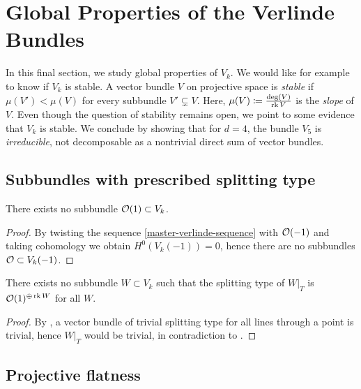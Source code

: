
\newcommand{\sm}{\text{sm}}
\newcommand{\PGL}{\operatorname {PGL}}
\newcommand{\ch}{\operatorname {ch}}
\newcommand{\CH}{\operatorname{CH}}

\section{Global Properties of the Verlinde Bundles}

In this final section, we study global properties of $V_k$. We would like for example to know if $V_k$ is stable. A vector bundle $V$ on projective space is \emph{stable} if $\mu(V')<\mu(V)$ for every subbundle $V'\subsetneq V$. Here,
$\mu(V)\coloneqq \frac{\deg(V)}{\operatorname{rk}{V}}$ is the \emph{slope} of $V$. Even though the question of stability remains open, we point to some evidence that $V_k$ is stable. We conclude by showing that for $d=4$, the bundle $V_5$ is \emph{irreducible}, \ie not decomposable as a nontrivial direct sum of vector bundles.

\subsection{Subbundles with prescribed splitting type}

\begin{proposition} \label{no-generic-splitting}
	There exists no subbundle $\mathcal{O}(1)\subset V_k$.
\end{proposition}

\begin{proof}
	By twisting the sequence \cref{master-verlinde-sequence} with $\mathcal{O}(-1)$ and taking cohomology we obtain $H^0(V_k(-1))=0$, hence there are no subbundles $\mathcal{O}\subset V_k(-1)$.
\end{proof}

\begin{corollary}
	There exists no subbundle $W \subset V_k$ such that the splitting type of $W|_T$ is $\mathcal{O}(1)^{\oplus \operatorname{rk} W}$ for all
	$W$.
\end{corollary}

\begin{proof}
	By \cite[Thm.\ 3.2.1]{okonek-schneider-spindler}, a vector bundle of trivial splitting type for all lines through a point is trivial, hence $W|_T$ would be trivial, in contradiction to .
\end{proof}

\subsection{Projective flatness}

